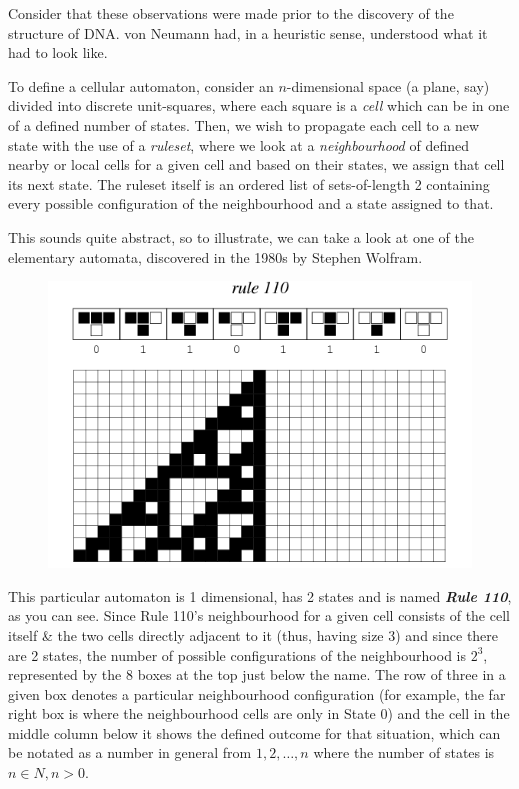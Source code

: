 \documentclass[10pt,a4paper]{article}
\begin{document}
\begin{multicols}{2}
Consider that these observations were made prior to the discovery of the
structure of DNA. von Neumann had, in a heuristic sense, understood what
it had to look like.

To define a cellular automaton, consider an \(n\)-dimensional space (a
plane, say) divided into discrete unit-squares, where each square is a
\emph{cell} which can be in one of a defined number of states. Then, we
wish to propagate each cell to a new state with the use of a
\emph{ruleset}, where we look at a \emph{neighbourhood} of defined
nearby or local cells for a given cell and based on their states, we
assign that cell its next state. The ruleset itself is an ordered list
of sets-of-length 2 containing every possible configuration of the
neighbourhood and a state assigned to that.

This sounds quite abstract, so to illustrate, we can take a look at one
of the elementary automata, discovered in the 1980s by Stephen Wolfram.

\begin{figure}[htbp]
	\centering
	\includegraphics[width=\linewidth]{image_0.png}
	\caption{}
\end{figure}

This particular automaton is 1 dimensional, has 2 states and is named
\textbf{\emph{Rule 110}}, as you can see. Since Rule 110's neighbourhood
for a given cell consists of the cell itself \& the two cells directly
adjacent to it (thus, having size 3) and since there are 2 states, the
number of possible configurations of the neighbourhood is \(2^3\),
represented by the 8 boxes at the top just below the name. The row of
three in a given box denotes a particular neighbourhood configuration
(for example, the far right box is where the neighbourhood cells are
only in State 0) and the cell in the middle column below it shows the
defined outcome for that situation, which can be notated as a number in
general from \(1,2,…,n\) where the number of states is
\(n \in N,n>0\).


\end{multicols}
\end{document}
